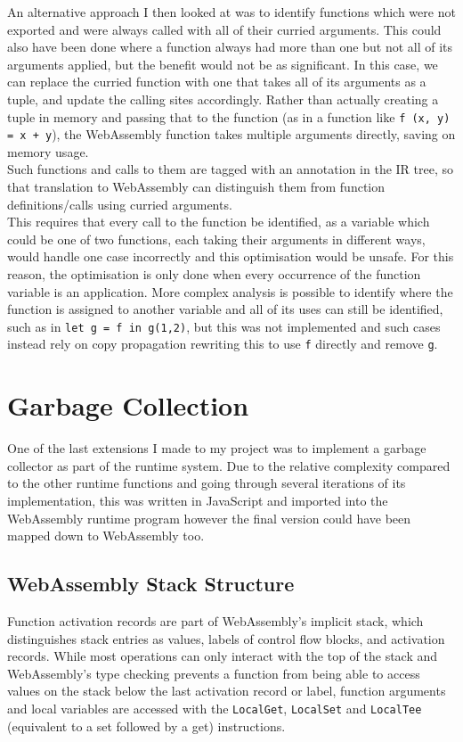 An alternative approach I then looked at was to identify functions which were not exported and were always called with all of their curried arguments. This could also have been done where a function always had more than one but not all of its arguments applied, but the benefit would not be as significant. In this case, we can replace the curried function with one that takes all of its arguments as a tuple, and update the calling sites accordingly. Rather than actually creating a tuple in memory and passing that to the function (as in a function like \verb|f (x, y) = x + y|), the WebAssembly function takes multiple arguments directly, saving on memory usage. \\
Such functions and calls to them are tagged with an annotation in the IR tree, so that translation to WebAssembly can distinguish them from function definitions/calls using curried arguments. \\
This requires that every call to the function be identified, as a variable which could be one of two functions, each taking their arguments in different ways, would handle one case incorrectly and this optimisation would be unsafe. For this reason, the optimisation is only done when every occurrence of the function variable is an application. More complex analysis is possible to identify where the function is assigned to another variable and all of its uses can still be identified, such as in \verb|let g = f in g(1,2)|, but this was not implemented and such cases instead rely on copy propagation rewriting this to use \verb|f| directly and remove \verb|g|.


\section{Garbage Collection}
One of the last extensions I made to my project was to implement a garbage collector as part of the runtime system. Due to the relative complexity compared to the other runtime functions and going through several iterations of its implementation, this was written in JavaScript and imported into the WebAssembly runtime program however the final version could have been mapped down to WebAssembly too.


\subsection{WebAssembly Stack Structure}
Function activation records are part of WebAssembly's implicit stack, which distinguishes stack entries as values, labels of control flow blocks, and activation records.%
While most operations can only interact with the top of the stack and WebAssembly's type checking prevents a function from being able to access values on the stack below the last activation record or label, function arguments and local variables are accessed with the \verb|LocalGet|, \verb|LocalSet| and \verb|LocalTee| (equivalent to a set followed by a get) instructions. 

